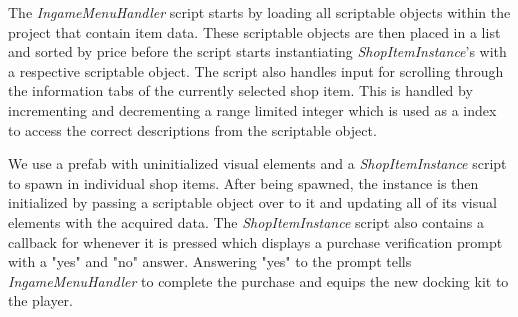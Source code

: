 The \emph{IngameMenuHandler} script starts by loading all scriptable objects within the project that contain item data. These scriptable objects are then placed in a list and sorted by price before the script starts instantiating \emph{ShopItemInstance}'s with a respective scriptable object. 
The script also handles input for scrolling through the information tabs of the currently selected shop item. This is handled by incrementing and decrementing a range limited integer which is used as a index to access the correct descriptions from the scriptable object. 

We use a prefab with uninitialized visual elements and a \emph{ShopItemInstance} script to spawn in individual shop items. After being spawned, the instance is then initialized by passing a scriptable object over to it and updating all of its visual elements with the acquired data. The \emph{ShopItemInstance} script also contains a callback for whenever it is pressed which displays a purchase verification prompt with a "yes" and "no" answer. Answering "yes" to the prompt tells \emph{IngameMenuHandler} to complete the purchase and equips the new docking kit to the player.  